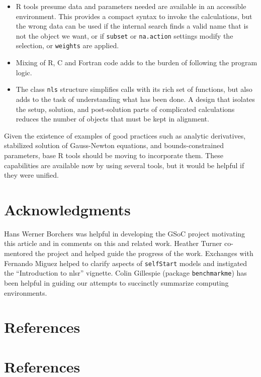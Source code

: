\begin{itemize}
\item
  R tools presume data and parameters needed are available in an
  accessible environment. This provides a compact syntax to invoke the
  calculations, but the wrong data can be used if the
  internal search finds a valid name that is not the object we want,
  or if \texttt{subset} or \texttt{na.action} settings modify the selection, or
  \texttt{weights} are applied.
\item
  Mixing of R, C and Fortran code adds to the burden of following the
  program logic.
\item
  The class \texttt{nls} structure simplifies calls with its rich set of functions, but
  also adds to the task of understanding what has been done. A design that isolates
  the setup, solution, and post-solution parts of complicated calculations reduces
  the number of objects that must be kept in alignment.
\end{itemize}

Given the existence of examples of good practices such as analytic derivatives,
stabilized solution of Gauss-Newton equations, and bounds-constrained parameters,
base R tools should
be moving to incorporate them. These capabilities are available now by
using several tools, but it would be helpful if they were unified.

\hypertarget{acknowledgments}{%
\section{Acknowledgments}\label{acknowledgments}}

Hans Werner Borchers was helpful in developing the GSoC project motivating this article
and in comments on this and related work. Heather Turner co-mentored the project
and helped guide the progress of the work. Exchanges with Fernando Miguez helped to
clarify aspects of \texttt{selfStart} models and instigated the ``Introduction to nlsr''
vignette. Colin Gillespie (package \texttt{benchmarkme}) has been helpful in guiding our
attempts to succinctly summarize computing environments.

\hypertarget{references}{%
\section{References}\label{references}}

\hypertarget{references-1}{%
\section*{References}\label{references-1}}

